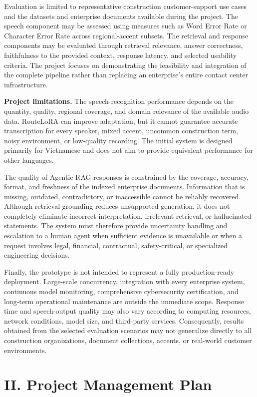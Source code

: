 \documentclass[11pt,a4paper]{article}
\newcommand{\chapterstart}[1]{\clearpage\section{#1}}
\begin{document}
Evaluation is limited to representative construction customer-support use
cases and the datasets and enterprise documents available during the project.
The speech component may be assessed using measures such as Word Error Rate or
Character Error Rate across regional-accent subsets. The retrieval and response
components may be evaluated through retrieval relevance, answer correctness,
faithfulness to the provided context, response latency, and selected usability
criteria. The project focuses on demonstrating the feasibility and integration
of the complete pipeline rather than replacing an enterprise's entire contact
center infrastructure.

\textbf{Project limitations.}
The speech-recognition performance depends on the quantity, quality, regional
coverage, and domain relevance of the available audio data. RouteLoRA can
improve adaptation, but it cannot guarantee accurate transcription for every
speaker, mixed accent, uncommon construction term, noisy environment, or
low-quality recording. The initial system is designed primarily for Vietnamese
and does not aim to provide equivalent performance for other languages.

The quality of Agentic RAG responses is constrained by the coverage, accuracy,
format, and freshness of the indexed enterprise documents. Information that is
missing, outdated, contradictory, or inaccessible cannot be reliably recovered.
Although retrieval grounding reduces unsupported generation, it does not
completely eliminate incorrect interpretation, irrelevant retrieval, or
hallucinated statements. The system must therefore provide uncertainty handling
and escalation to a human agent when sufficient evidence is unavailable or
when a request involves legal, financial, contractual, safety-critical, or
specialized engineering decisions.

Finally, the prototype is not intended to represent a fully production-ready
deployment. Large-scale concurrency, integration with every enterprise system,
continuous model monitoring, comprehensive cybersecurity certification, and
long-term operational maintenance are outside the immediate scope. Response
time and speech-output quality may also vary according to computing resources,
network conditions, model size, and third-party services. Consequently, results
obtained from the selected evaluation scenarios may not generalize directly to
all construction organizations, document collections, accents, or real-world
customer environments.

\chapterstart{II. Project Management Plan}
\end{document}
